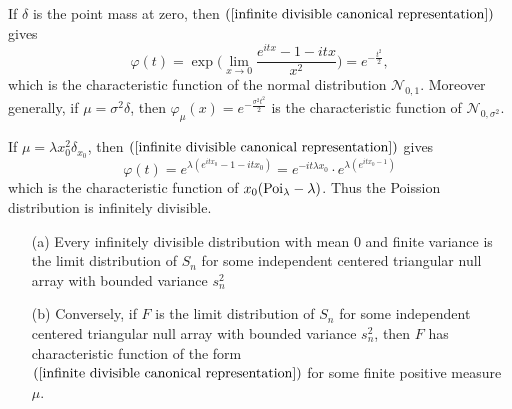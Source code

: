 \begin{example}\label{normal diatribution generate measure}
If $\delta$ is the point mass at zero, then $(\ref{infinite divisible canonical representation})$ gives
\[\varphi(t)=\exp\Big(\lim_{x\to 0}\frac{e^{itx}-1-itx}{x^2}\Big)=e^{-\frac{t^2}{2}},\]
which is the characteristic function of the normal distribution $\mathcal{N}_{0,1}$. Moreover generally, if $\mu=\sigma^2\delta$, then $\varphi_\mu(x)=e^{-\frac{\sigma^2t^2}{2}}$ is the characteristic function of $\mathcal{N}_{0,\sigma^2}$.
\end{example}
\begin{example}\label{Poission diatribution generate measure}
If $\mu=\lambda x_0^2\delta_{x_0}$, then $(\ref{infinite divisible canonical representation})$ gives
\[\varphi(t)=e^{\lambda(e^{itx_0}-1-itx_0)}=e^{-it\lambda x_0}\cdot e^{\lambda(e^{itx_0-1})}\]
which is the characteristic function of $x_0(\mathrm{Poi}_\lambda-\lambda)$. Thus the Poission distribution is infinitely divisible. 
\end{example}
\begin{theorem}
\mbox{}
\begin{itemize}
\item[(a)] Every infinitely divisible distribution with mean $0$ and finite variance is the limit distribution of $S_n$ for some independent centered triangular null array with bounded variance $s_n^2$
\item[(b)] Conversely, if $F$ is the limit distribution of $S_n$ for some independent centered triangular null array with bounded variance $s_n^2$, then $F$ has characteristic function of the form $(\ref{infinite divisible canonical representation})$ for some finite positive measure $\mu$.
\end{itemize}
\end{theorem}
